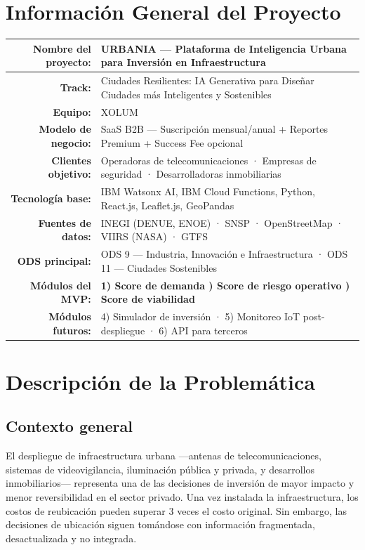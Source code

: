 \documentclass[12pt,a4paper]{article}
\begin{document}
\section{Información General del Proyecto}

\begin{table}[H]
\centering
\renewcommand{\arraystretch}{1.3}
\begin{tabularx}{\textwidth}{>{\bfseries\color{negro}}r X}
\toprule
Nombre del proyecto: & URBANIA — Plataforma de Inteligencia Urbana para Inversión en Infraestructura \\
\midrule
Track: & Ciudades Resilientes: IA Generativa para Diseñar Ciudades más Inteligentes y Sostenibles \\
\midrule
Equipo: & XOLUM \\
\midrule
Modelo de negocio: & SaaS B2B — Suscripción mensual/anual + Reportes Premium + Success Fee opcional \\
\midrule
Clientes objetivo: & Operadoras de telecomunicaciones · Empresas de seguridad · Desarrolladoras inmobiliarias \\
\midrule
Tecnología base: & IBM Watsonx AI, IBM Cloud Functions, Python, React.js, Leaflet.js, GeoPandas \\
\midrule
Fuentes de datos: & INEGI (DENUE, ENOE) · SNSP · OpenStreetMap · VIIRS (NASA) · GTFS \\
\midrule
ODS principal: & ODS 9 — Industria, Innovación e Infraestructura · ODS 11 — Ciudades Sostenibles \\
\midrule
\textbf{Módulos del MVP:} & \textbf{1) Score de demanda \quad 2) Score de riesgo operativo \quad 3) Score de viabilidad} \\
\midrule
Módulos futuros: & 4) Simulador de inversión · 5) Monitoreo IoT post-despliegue · 6) API para terceros \\
\bottomrule
\end{tabularx}
\end{table}


\newpage
\section{Descripción de la Problemática}

\subsection{Contexto general}

El despliegue de infraestructura urbana —antenas de telecomunicaciones, sistemas de videovigilancia, iluminación pública y privada, y desarrollos inmobiliarios— representa una de las decisiones de inversión de mayor impacto y menor reversibilidad en el sector privado. Una vez instalada la infraestructura, los costos de reubicación pueden superar 3 veces el costo original. Sin embargo, las decisiones de ubicación siguen tomándose con información fragmentada, desactualizada y no integrada.
\end{document}
